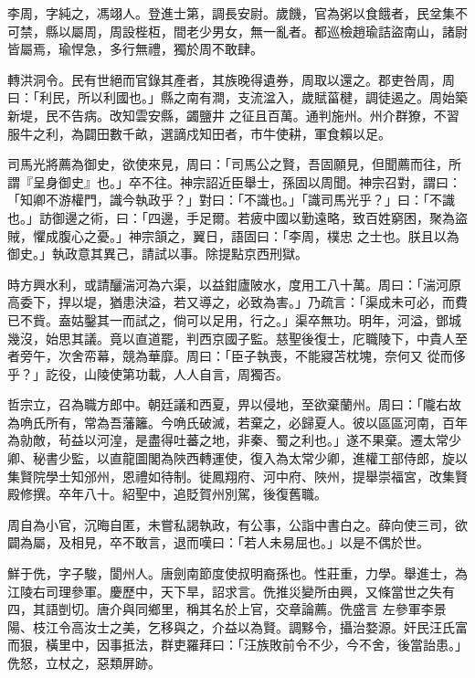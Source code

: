 \begin{pinyinscope}
 李周，字純之，馮翊人。登進士第，調長安尉。歲饑，官為粥以食餓者，民坌集不可禁，縣以屬周，周設梐枑，間老少男女，無一亂者。都巡檢趙瑜詰盜南山，諸尉皆屬焉，瑜悍急，多行無禮，獨於周不敢肆。



 轉洪洞令。民有世絕而官錄其產者，其族晚得遺券，周取以還之。郡吏咎周，周曰：「利民，所以利國也。」縣之南有澗，支流湓入，歲賦菑楗，調徒遏之。周始築新堤，民不告病。改知雲安縣，蠲鹽井
 之征且百萬。通判施州。州介群獠，不習服牛之利，為闢田數千畝，選謫戍知田者，市牛使耕，軍食賴以足。



 司馬光將薦為御史，欲使來見，周曰：「司馬公之賢，吾固願見，但聞薦而往，所謂『呈身御史』也。」卒不往。神宗詔近臣舉士，孫固以周聞。神宗召對，謂曰：「知卿不游權門，識今執政乎？」對曰：「不識也。」「識司馬光乎？」曰：「不識也。」訪御邊之術，曰：「四邊，手足爾。若疲中國以勤遠略，致百姓窮困，聚為盜賊，懼成腹心之憂。」神宗頷之，翼日，語固曰：「李周，樸忠
 之士也。朕且以為御史。」執政意其異己，請試以事。除提點京西刑獄。



 時方興水利，或請釃湍河為六渠，以益鉗廬陂水，度用工八十萬。周曰：「湍河原高委下，捍以堤，猶患決溢，若又導之，必致為害。」乃疏言：「渠成未可必，而費已不貲。盍姑鑿其一而試之，倘可以足用，行之。」渠卒無功。明年，河溢，鄧城幾沒，始思其議。竟以直道罷，判西京國子監。慈聖後復士，庀職陵下，中貴人至者旁午，次舍帟幕，競為華靡。周曰：「臣子執喪，不能寢苫枕塊，奈何又
 從而侈乎？」訖役，山陵使第功載，人人自言，周獨否。



 哲宗立，召為職方郎中。朝廷議和西夏，畀以侵地，至欲棄蘭州。周曰：「隴右故為唃氏所有，常為吾藩籬。今唃氏破滅，若棄之，必歸夏人。彼以區區河南，百年為勍敵，茍益以河湟，是盡得吐蕃之地，非秦、蜀之利也。」遂不果棄。遷太常少卿、秘書少監，以直龍圖閣為陜西轉運使，復入為太常少卿，進權工部侍郎，旋以集賢院學士知邠州，恩禮如待制。徙鳳翔府、河中府、陜州，提舉崇福宮，改集賢
 殿修撰。卒年八十。紹聖中，追貶賀州別駕，後復舊職。



 周自為小官，沉晦自匿，未嘗私謁執政，有公事，公詣中書白之。薛向使三司，欲闢為屬，及相見，卒不敢言，退而嘆曰：「若人未易屈也。」以是不偶於世。



 鮮于侁，字子駿，閬州人。唐劍南節度使叔明裔孫也。性莊重，力學。舉進士，為江陵右司理參軍。慶歷中，天下旱，詔求言。侁推災變所由興，又條當世之失有四，其語剴切。唐介與同鄉里，稱其名於上官，交章論薦。侁盛言
 左參軍李景陽、枝江令高汝士之美，乞移與之，介益以為賢。調黟令，攝治婺源。奸民汪氏富而狠，橫里中，因事抵法，群吏羅拜曰：「汪族敗前令不少，今不舍，後當詒患。」侁怒，立杖之，惡類屏跡。




\end{pinyinscope}
